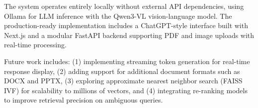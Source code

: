 \documentclass[conference]{IEEEtran}
\begin{document}
The system operates entirely locally without external API dependencies, using Ollama for LLM inference with the Qwen3-VL vision-language model. The production-ready implementation includes a ChatGPT-style interface built with Next.js and a modular FastAPI backend supporting PDF and image uploads with real-time processing.

Future work includes: (1) implementing streaming token generation for real-time response display, (2) adding support for additional document formats such as DOCX and PPTX, (3) exploring approximate nearest neighbor search (FAISS IVF) for scalability to millions of vectors, and (4) integrating re-ranking models to improve retrieval precision on ambiguous queries.

\end{document}
